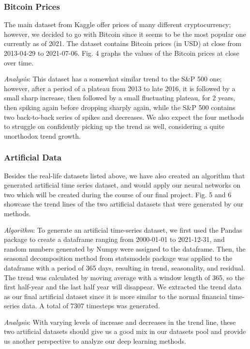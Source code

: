 \documentclass[letterpaper, 10 pt, conference]{ieeeconf}  %
\begin{document}
        \subsubsection{Bitcoin Prices} The main dataset from Kaggle offer prices of many different cryptocurrency; however, we decided to go with Bitcoin since it seems to be the most popular one currently as of 2021. The dataset contains Bitcoin prices (in USD) at close from 2013-04-29 to 2021-07-06. Fig. 4 graphs the values of the Bitcoin prices at close over time.

        \textit{Analysis}: This dataset has a somewhat similar trend to the S\&P 500 one; however, after a period of a plateau from 2013 to late 2016, it is followed by a small sharp increase, then followed by a small fluctuating plateau, for 2 years, then spiking again before dropping sharply again, while the S\&P 500 contains two back-to-back series of spikes and decreases. We also expect the four methods to struggle on confidently picking up the trend as well, considering a quite unorthodox trend growth.

        \subsubsection{Artificial Data} Besides the real-life datasets listed above, we have also created an algorithm that generated artificial time series dataset, and would apply our neural networks on two which will be created during the course of our final project. Fig. 5 and 6 showcase the trend lines of the two artificial datasets that were generated by our methods.

        \textit{Algorithm}: To generate an artificial time-series dataset, we first used the Pandas package to create a dataframe ranging from 2000-01-01 to 2021-12-31,  and random numbers generated by Numpy were assigned to the dataframe. Then, the seasonal decomposition method from statsmodels package was applied to the dataframe with a period of 365 days, resulting in trend, seasonality, and residual. The trend was calculated by moving average with a window length of 365, so the first half-year and the last half year will disappear. We extracted the trend data as our final artificial dataset since it is more similar to the normal financial time-series data. A total of 7307 timesteps was generated.

        \textit{Analysis}: With varying levels of increase and decreases in the trend line, these two artificial datasets should give us a good mix in our datasets pool and provide us another perspective to analyze our deep learning methods.
    
\end{document}
